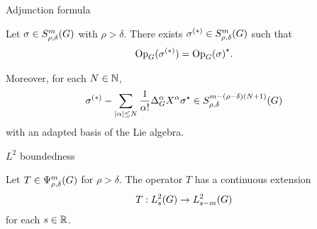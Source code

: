 \documentclass{beamer}
\begin{document}
\begin{frame}{Adjunction formula}
    \begin{theorem}
        Let $\sigma \in S^{m}_{\rho, \delta}(G)$ with $\rho > \delta$.
        There exists $\sigma^{(*)} \in S^{m}_{\rho, \delta}(G)$ such that
        \begin{align*}
            \mathrm{Op}_{G}(\sigma^{(*)}) = {\mathrm{Op}_{G}(\sigma)}^\star.
        \end{align*}

        Moreover,
        for each $N \in \mathbb{N}$,
        \begin{align*}
            \sigma^{(*)} - \sum_{\abs \alpha \leq N} \frac 1 {\alpha!} \DifferenceOperatorOrder {\alpha} \LeftDifferentialOperator {\alpha} \adj \sigma \in \SymbolClass {m - (\rho - \delta) (N + 1)} {\rho, \delta}
        \end{align*}
        with an adapted basis of the Lie algebra.
    \end{theorem}
\end{frame}

\begin{frame}{$L^2$ boundedness}
    \begin{theorem}[$L^2$ boundedness]
        Let $T \in \Psi^{m}_{\rho, \delta}(G)$ for $\rho > \delta$.
        The operator $T$ has a continuous extension
        \begin{align*}
            T : L^2_{s}(G) \to L^2_{s - m}(G)
        \end{align*}
        for each $s \in \mathbb{R}$.
    \end{theorem}
\end{frame}
\end{document}
